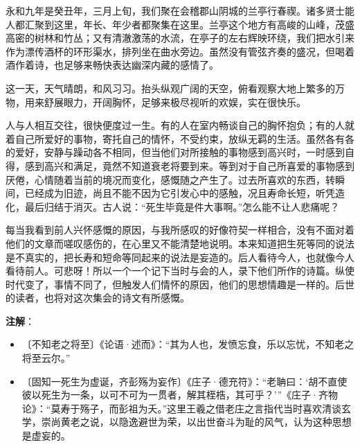 \documentclass[12pt,UTF-8,openany]{ctexbook}
\begin{document}
\begin{normalsize}
    
    永和九年是癸丑年，三月上旬，我们聚在会稽郡山阴城的兰亭行春禊。诸多贤士能人都汇聚到这里，年长、年少者都聚集在这里。兰亭这个地方有高峻的山峰，茂盛高密的树林和竹丛；又有清澈激荡的水流，在亭子的左右辉映环绕，我们把水引来作为漂传酒杯的环形渠水，排列坐在曲水旁边。虽然没有管弦齐奏的盛况，但喝着酒作着诗，也足够来畅快表达幽深内藏的感情了。
    
    这一天，天气晴朗，和风习习。抬头纵观广阔的天空，俯看观察大地上繁多的万物，用来舒展眼力，开阔胸怀，足够来极尽视听的欢娱，实在很快乐。
    
    人与人相互交往，很快便度过一生。有的人在室内畅谈自己的胸怀抱负；有的人就着自己所爱好的事物，寄托自己的情怀，不受约束，放纵无羁的生活。虽然各有各的爱好，安静与躁动各不相同，但当他们对所接触的事物感到高兴时，一时感到自得，感到高兴和满足，竟然不知道衰老将要到来。等到对于自己所喜爱的事物感到厌倦，心情随着当前的境况而变化，感慨随之产生了。过去所喜欢的东西，转瞬间，已经成为旧迹，尚且不能不因为它引发心中的感触，况且寿命长短，听凭造化，最后归结于消灭。古人说：“死生毕竟是件大事啊。”怎么能不让人悲痛呢？
    
    每当我看到前人兴怀感慨的原因，与我所感叹的好像符契一样相合，没有不面对着他们的文章而嗟叹感伤的，在心里又不能清楚地说明。本来知道把生死等同的说法是不真实的，把长寿和短命等同起来的说法是妄造的。后人看待今人，也就像今人看待前人。可悲呀！所以一个一个记下当时与会的人，录下他们所作的诗篇。纵使时代变了，事情不同了，但触发人们情怀的原因，他们的思想情趣是一样的。后世的读者，也将对这次集会的诗文有所感慨。
    
\end{normalsize}


\newpage

\textbf{注解}：

\vspace{-1em}

\begin{itemize}
    \setlength\itemsep{-0.2em}
    \item〔不知老之将至〕《论语·述而》：“其为人也，发愤忘食，乐以忘忧，不知老之将至云尔。”
    \item〔固知一死生为虚诞，齐彭殇为妄作〕《庄子·德充符》：“老聃曰：‘胡不直使彼以死生为一条，以可不可为一贯者，解其桎梏，其可乎？’”《庄子·齐物论》：“莫寿于殇子，而彭祖为夭。”这里王羲之借老庄之言指代当时喜欢清谈玄学，崇尚黄老之说，以隐逸避世为荣，以出世奋斗为耻的风气，认为这种思想是虚妄的。
\end{itemize}
\end{document}
